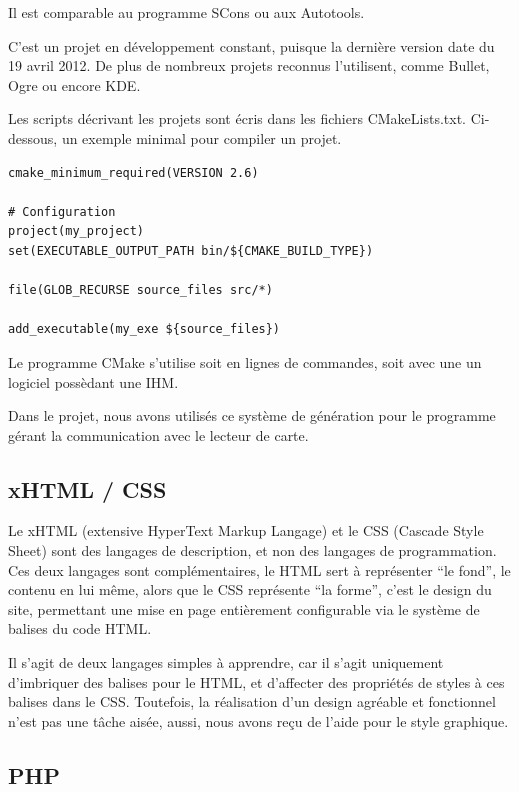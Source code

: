 Il est comparable au programme SCons ou aux Autotools.

C'est un projet en développement constant, puisque la dernière version date du 19
avril 2012. De plus de nombreux projets reconnus l'utilisent, comme Bullet, Ogre
ou encore KDE.

Les scripts décrivant les projets sont écris dans les fichiers CMakeLists.txt.
Ci-dessous, un exemple minimal pour compiler un projet.

    \lstset{language=Bash}
    \begin{lstlisting} 
cmake_minimum_required(VERSION 2.6)
		
# Configuration
project(my_project)
set(EXECUTABLE_OUTPUT_PATH bin/${CMAKE_BUILD_TYPE})

file(GLOB_RECURSE source_files src/*)

add_executable(my_exe ${source_files})
    \end{lstlisting}

Le programme CMake s'utilise soit en lignes de commandes, soit avec une un logiciel
possèdant une IHM.

Dans le projet, nous avons utilisés ce système de génération pour le programme 
gérant la communication avec le lecteur de carte.

        \subsection{xHTML / CSS}

Le xHTML (extensive HyperText Markup Langage) et le CSS (Cascade Style Sheet) sont
des langages de description, et non des langages de programmation.
Ces deux langages sont complémentaires, le HTML sert à représenter ``le fond'', le contenu
en lui même, alors que le CSS représente ``la forme'', c'est le design du site, permettant
une mise en page entièrement configurable via le système de balises du code HTML.

Il s'agit de deux langages simples à apprendre, car il s'agit uniquement d'imbriquer des
balises pour le HTML, et d'affecter des propriétés de styles à ces balises dans le CSS.
Toutefois, la réalisation d'un design agréable et fonctionnel n'est pas une tâche aisée,
aussi, nous avons reçu de l'aide pour le style graphique.

        \subsection{PHP}

